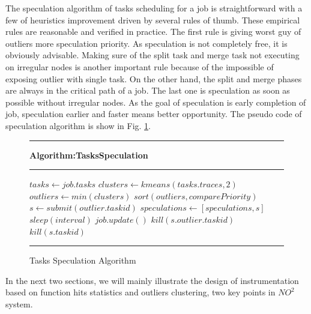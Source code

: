The speculation algorithm of tasks scheduling for a job is straightforward with a few of heuristics improvement driven by several rules of thumb. These empirical rules are reasonable and verified in practice. The first rule is giving worst guy of outliers more speculation priority. As speculation is not completely free, it is obviously advisable. Making sure of the split task and merge task not executing on irregular nodes is another important rule because of the impossible of exposing outlier with single task. On the other hand, the split and merge phases are always in the critical path of a job. The last one is speculation as soon as possible without irregular nodes. As the goal of speculation is early completion of job, speculation earlier and faster means better opportunity. The pseudo code of speculation algorithm is show in Fig. \ref{fig-spec-algo}.

\begin{figure}
\rule[-.2pt]{0.9\columnwidth}{0.9pt}
\textbf{Algorithm:TasksSpeculation}
\rule[-.2pt]{0.9\columnwidth}{0.5pt}

\begin{algorithmic}[1]




    \State $tasks\gets job.tasks$
    \State $clusters\gets kmeans(tasks.traces, 2)$
        \State $outliers\gets min(clusters)$
        \State $sort(outliers, comparePriority)$
            \State $s\gets submit(outlier.taskid)$
            \State $speculations\gets [speculations, s]$
        \EndFor
    \EndIf
    \State $sleep(interval)$
    \State $job.update()$
            \State $kill(s.outlier.taskid)$
            \State $kill(s.taskid)$
        \EndIf
    \EndFor
\EndWhile\label{specendwhile}
\end{algorithmic}
\rule[-.2pt]{0.9\columnwidth}{0.8pt}
\caption{Tasks Speculation Algorithm}\label{fig-spec-algo}
\end{figure}

In the next two sections, we will mainly illustrate the design of instrumentation based on function hits statistics and outliers clustering, two key points in $NO^2$ system. 